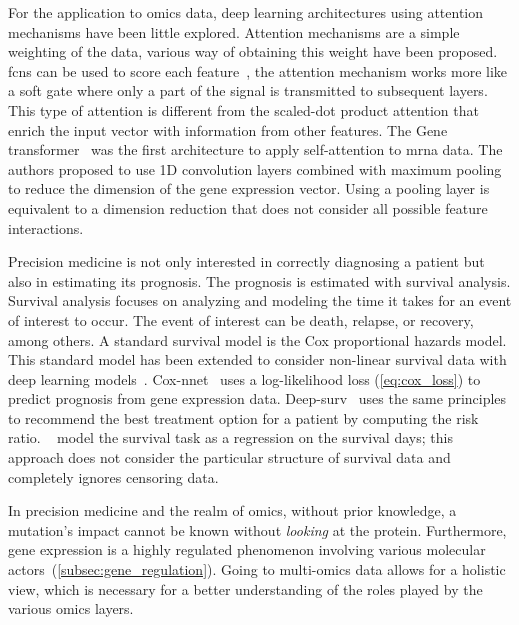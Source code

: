 \documentclass[../main.tex]{subfiles}
\begin{document}
	For the application to omics data, deep learning architectures using attention mechanisms have been little explored.
	Attention mechanisms are a simple weighting of the data, various way of obtaining this weight have been proposed.
	\Glspl{fcn} can be used to score each feature~\cite{Lee2022,beykikhoshkDeepTRIAGEInterpretableIndividualised2020a}, the attention mechanism works more like a soft gate where only a part of the signal is transmitted to subsequent layers.
	This type of attention is different from the scaled-dot product attention that enrich the input vector with information from other features.
	The Gene transformer~\cite{Khan2023} was the first architecture to apply self-attention to \gls{mrna} data.
	The authors proposed to use 1D convolution layers combined with maximum pooling to reduce the dimension of the gene expression vector.
	Using a pooling layer is equivalent to a dimension reduction that does not consider all possible feature interactions.

	Precision medicine is not only interested in correctly diagnosing a patient but also in estimating its prognosis.
	The prognosis is estimated with survival analysis.
	Survival analysis focuses on analyzing and modeling the time it takes for an event of interest to occur.
	The event of interest can be death, relapse, or recovery, among others.
	A standard survival model is the Cox proportional hazards model.
	This standard model has been extended to consider non-linear survival data with deep learning models~\cite{katzmanDeepSurvPersonalizedTreatment2018,Ching2018}.
	Cox-nnet~\cite{Ching2018} uses a log-likelihood loss (\cref{eq:cox_loss}) to predict prognosis from gene expression data.
	Deep-surv~\cite{katzmanDeepSurvPersonalizedTreatment2018} uses the same principles to recommend the best treatment option for a patient by computing the risk ratio.
	\citeauthor{Lee2022}~\cite{Lee2022} model the survival task as a regression on the survival days; this approach does not consider the particular structure of survival data and completely ignores censoring data.

	In precision medicine and the realm of omics, without prior knowledge, a mutation's impact cannot be known without \emph{looking} at the protein.
	Furthermore, gene expression is a highly regulated phenomenon involving various molecular actors~(\cref{subsec:gene_regulation}).
	Going to multi-omics data allows for a holistic view, which is necessary for a better understanding of the roles played by the various omics layers.
\end{document}
